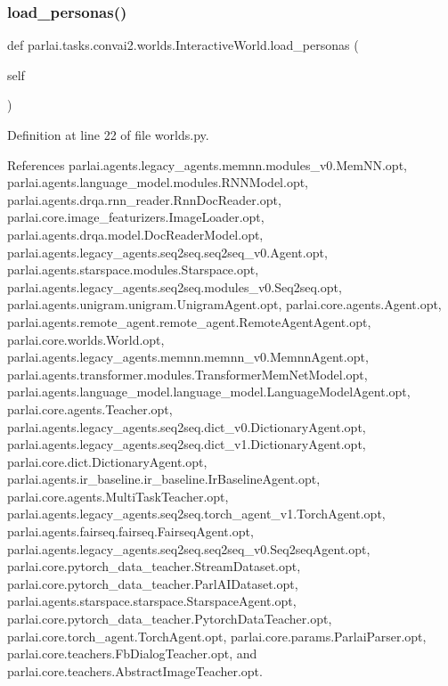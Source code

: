 \subsubsection{\texorpdfstring{load\+\_\+personas()}{load\_personas()}}
{\footnotesize\ttfamily def parlai.\+tasks.\+convai2.\+worlds.\+Interactive\+World.\+load\+\_\+personas (\begin{DoxyParamCaption}\item[{}]{self }\end{DoxyParamCaption})}



Definition at line 22 of file worlds.\+py.



References parlai.\+agents.\+legacy\+\_\+agents.\+memnn.\+modules\+\_\+v0.\+Mem\+N\+N.\+opt, parlai.\+agents.\+language\+\_\+model.\+modules.\+R\+N\+N\+Model.\+opt, parlai.\+agents.\+drqa.\+rnn\+\_\+reader.\+Rnn\+Doc\+Reader.\+opt, parlai.\+core.\+image\+\_\+featurizers.\+Image\+Loader.\+opt, parlai.\+agents.\+drqa.\+model.\+Doc\+Reader\+Model.\+opt, parlai.\+agents.\+legacy\+\_\+agents.\+seq2seq.\+seq2seq\+\_\+v0.\+Agent.\+opt, parlai.\+agents.\+starspace.\+modules.\+Starspace.\+opt, parlai.\+agents.\+legacy\+\_\+agents.\+seq2seq.\+modules\+\_\+v0.\+Seq2seq.\+opt, parlai.\+agents.\+unigram.\+unigram.\+Unigram\+Agent.\+opt, parlai.\+core.\+agents.\+Agent.\+opt, parlai.\+agents.\+remote\+\_\+agent.\+remote\+\_\+agent.\+Remote\+Agent\+Agent.\+opt, parlai.\+core.\+worlds.\+World.\+opt, parlai.\+agents.\+legacy\+\_\+agents.\+memnn.\+memnn\+\_\+v0.\+Memnn\+Agent.\+opt, parlai.\+agents.\+transformer.\+modules.\+Transformer\+Mem\+Net\+Model.\+opt, parlai.\+agents.\+language\+\_\+model.\+language\+\_\+model.\+Language\+Model\+Agent.\+opt, parlai.\+core.\+agents.\+Teacher.\+opt, parlai.\+agents.\+legacy\+\_\+agents.\+seq2seq.\+dict\+\_\+v0.\+Dictionary\+Agent.\+opt, parlai.\+agents.\+legacy\+\_\+agents.\+seq2seq.\+dict\+\_\+v1.\+Dictionary\+Agent.\+opt, parlai.\+core.\+dict.\+Dictionary\+Agent.\+opt, parlai.\+agents.\+ir\+\_\+baseline.\+ir\+\_\+baseline.\+Ir\+Baseline\+Agent.\+opt, parlai.\+core.\+agents.\+Multi\+Task\+Teacher.\+opt, parlai.\+agents.\+legacy\+\_\+agents.\+seq2seq.\+torch\+\_\+agent\+\_\+v1.\+Torch\+Agent.\+opt, parlai.\+agents.\+fairseq.\+fairseq.\+Fairseq\+Agent.\+opt, parlai.\+agents.\+legacy\+\_\+agents.\+seq2seq.\+seq2seq\+\_\+v0.\+Seq2seq\+Agent.\+opt, parlai.\+core.\+pytorch\+\_\+data\+\_\+teacher.\+Stream\+Dataset.\+opt, parlai.\+core.\+pytorch\+\_\+data\+\_\+teacher.\+Parl\+A\+I\+Dataset.\+opt, parlai.\+agents.\+starspace.\+starspace.\+Starspace\+Agent.\+opt, parlai.\+core.\+pytorch\+\_\+data\+\_\+teacher.\+Pytorch\+Data\+Teacher.\+opt, parlai.\+core.\+torch\+\_\+agent.\+Torch\+Agent.\+opt, parlai.\+core.\+params.\+Parlai\+Parser.\+opt, parlai.\+core.\+teachers.\+Fb\+Dialog\+Teacher.\+opt, and parlai.\+core.\+teachers.\+Abstract\+Image\+Teacher.\+opt.



